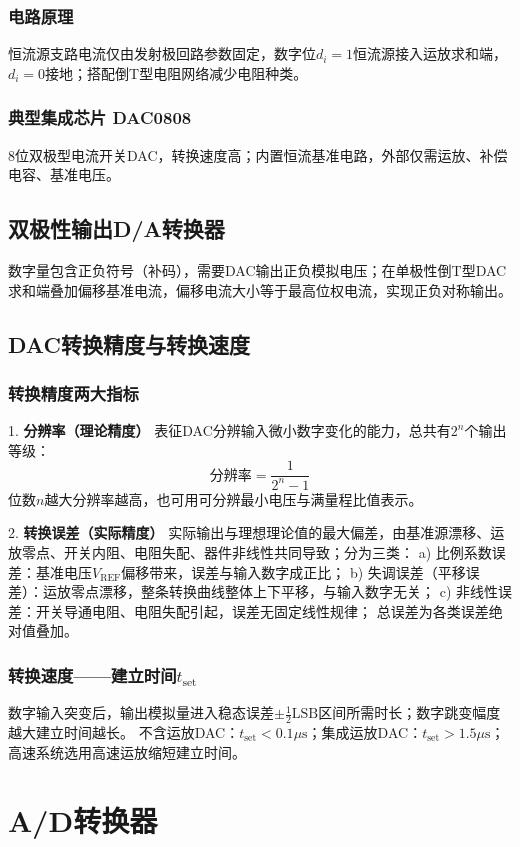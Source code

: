 \subsubsection{电路原理}
恒流源支路电流仅由发射极回路参数固定，数字位$d_i=1$恒流源接入运放求和端，$d_i=0$接地；搭配倒T型电阻网络减少电阻种类。

\subsubsection{典型集成芯片 DAC0808}
8位双极型电流开关DAC，转换速度高；内置恒流基准电路，外部仅需运放、补偿电容、基准电压。

\subsection{双极性输出D/A转换器}
数字量包含正负符号（补码），需要DAC输出正负模拟电压；在单极性倒T型DAC求和端叠加偏移基准电流，偏移电流大小等于最高位权电流，实现正负对称输出。

\subsection{DAC转换精度与转换速度}
\subsubsection{转换精度两大指标}
1. \textbf{分辨率（理论精度）}
表征DAC分辨输入微小数字变化的能力，总共有$2^n$个输出等级：
\[
\text{分辨率} = \frac{1}{2^n - 1}
\]
位数$n$越大分辨率越高，也可用可分辨最小电压与满量程比值表示。

2. \textbf{转换误差（实际精度）}
实际输出与理想理论值的最大偏差，由基准源漂移、运放零点、开关内阻、电阻失配、器件非线性共同导致；分为三类：
    a) 比例系数误差：基准电压$V_\text{REF}$偏移带来，误差与输入数字成正比；
    b) 失调误差（平移误差）：运放零点漂移，整条转换曲线整体上下平移，与输入数字无关；
    c) 非线性误差：开关导通电阻、电阻失配引起，误差无固定线性规律；
总误差为各类误差绝对值叠加。

\subsubsection{转换速度——建立时间$t_\text{set}$}
数字输入突变后，输出模拟量进入稳态误差$\pm\frac{1}{2}\text{LSB}$区间所需时长；数字跳变幅度越大建立时间越长。
不含运放DAC：$t_\text{set}<0.1\mu\text{s}$；集成运放DAC：$t_\text{set}>1.5\mu\text{s}$；高速系统选用高速运放缩短建立时间。

\section{A/D转换器}
